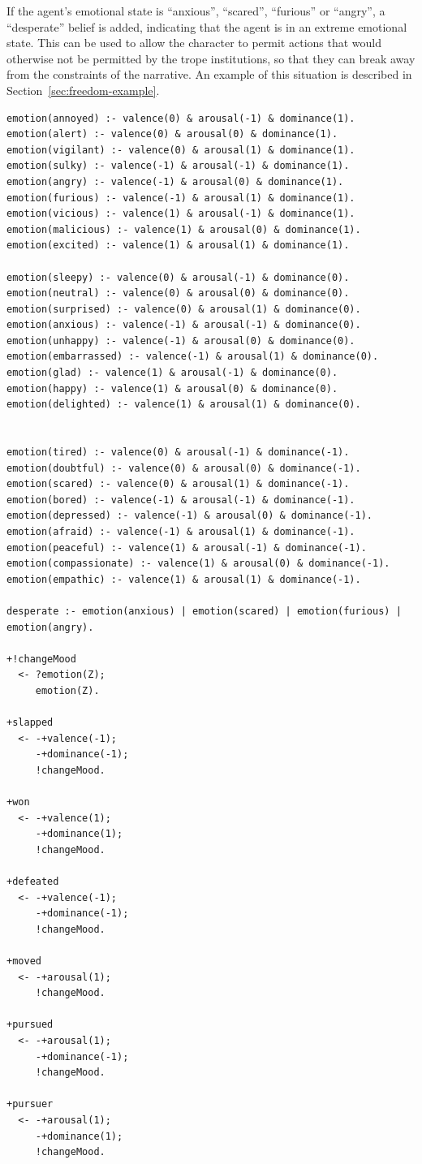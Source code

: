 \documentclass[11pt]{report}
\begin{document}
If the agent's emotional state is ``anxious'', ``scared'', ``furious'' or
``angry'', a ``desperate'' belief is added, indicating that the agent is in an
extreme emotional state. This can be used to allow the character to permit
actions that would otherwise not be permitted by the trope institutions, so that
they can break away from the constraints of the narrative. An example of this
situation is described in Section~\ref{sec:freedom-example}.

\begin{lstlisting}[showstringspaces=false,
label=lst:pjfull-emotion,caption={AgentSpeak code for agent emotions}]
emotion(annoyed) :- valence(0) & arousal(-1) & dominance(1).
emotion(alert) :- valence(0) & arousal(0) & dominance(1).
emotion(vigilant) :- valence(0) & arousal(1) & dominance(1).
emotion(sulky) :- valence(-1) & arousal(-1) & dominance(1).
emotion(angry) :- valence(-1) & arousal(0) & dominance(1).
emotion(furious) :- valence(-1) & arousal(1) & dominance(1).
emotion(vicious) :- valence(1) & arousal(-1) & dominance(1).
emotion(malicious) :- valence(1) & arousal(0) & dominance(1).
emotion(excited) :- valence(1) & arousal(1) & dominance(1).

emotion(sleepy) :- valence(0) & arousal(-1) & dominance(0).
emotion(neutral) :- valence(0) & arousal(0) & dominance(0).
emotion(surprised) :- valence(0) & arousal(1) & dominance(0).
emotion(anxious) :- valence(-1) & arousal(-1) & dominance(0).
emotion(unhappy) :- valence(-1) & arousal(0) & dominance(0).
emotion(embarrassed) :- valence(-1) & arousal(1) & dominance(0).
emotion(glad) :- valence(1) & arousal(-1) & dominance(0).
emotion(happy) :- valence(1) & arousal(0) & dominance(0).
emotion(delighted) :- valence(1) & arousal(1) & dominance(0).


emotion(tired) :- valence(0) & arousal(-1) & dominance(-1).
emotion(doubtful) :- valence(0) & arousal(0) & dominance(-1).
emotion(scared) :- valence(0) & arousal(1) & dominance(-1).
emotion(bored) :- valence(-1) & arousal(-1) & dominance(-1).
emotion(depressed) :- valence(-1) & arousal(0) & dominance(-1).
emotion(afraid) :- valence(-1) & arousal(1) & dominance(-1).
emotion(peaceful) :- valence(1) & arousal(-1) & dominance(-1).
emotion(compassionate) :- valence(1) & arousal(0) & dominance(-1).
emotion(empathic) :- valence(1) & arousal(1) & dominance(-1).

desperate :- emotion(anxious) | emotion(scared) | emotion(furious) | emotion(angry).

+!changeMood
  <- ?emotion(Z);
     emotion(Z).

+slapped
  <- -+valence(-1);
     -+dominance(-1);
     !changeMood.

+won
  <- -+valence(1);
     -+dominance(1);
     !changeMood.

+defeated
  <- -+valence(-1);
     -+dominance(-1);
     !changeMood.

+moved
  <- -+arousal(1);
     !changeMood.

+pursued
  <- -+arousal(1);
     -+dominance(-1);
     !changeMood.

+pursuer
  <- -+arousal(1);
     -+dominance(1);
     !changeMood.
\end{lstlisting}
\end{document}
